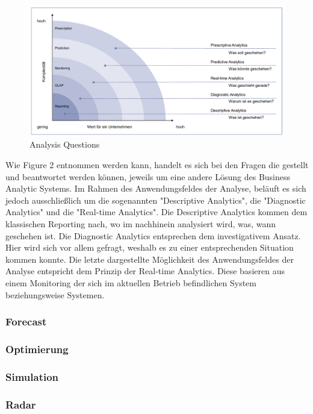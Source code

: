 \documentclass[12pt,twocolumn,twoside]{conference}   %
\begin{document}
\begin{figure}[H]
\centering
\includegraphics[width=20cm]{Abbildungen/Analysis.png}
\caption{Analysis Questions}\label{visina8}
\end{figure}

Wie Figure 2 entnommen werden kann, handelt es sich bei den Fragen die gestellt und beantwortet werden können, jeweils um eine andere Lösung des Business Analytic Systems. Im Rahmen des Anwendungsfeldes der Analyse, beläuft es sich jedoch ausschließlich um die sogenannten "Descriptive Analytics", die "Diagnostic Analytics" und die "Real-time Analytics". Die Descriptive Analytics kommen dem klassischen Reporting nach, wo im nachhinein analysiert wird, was, wann geschehen ist. Die Diagnostic Analytics entsprechen dem investigativem Ansatz. Hier wird sich vor allem gefragt, weshalb es zu einer entsprechenden Situation kommen konnte. Die letzte dargestellte Möglichkeit des Anwendungsfeldes der Analyse entspricht dem Prinzip der Real-time Analytics. Diese basieren aus einem Monitoring der sich im aktuellen Betrieb befindlichen System beziehungsweise Systemen. 

\subsubsection{Forecast}

\subsubsection{Optimierung}

\subsubsection{Simulation}

\subsubsection{Radar}
\end{document}
